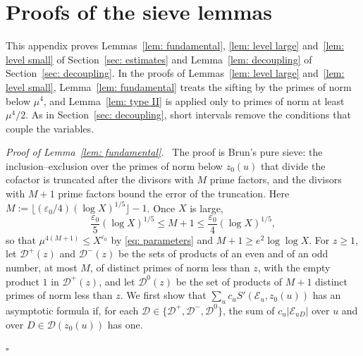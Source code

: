 \documentclass{article}
\numberwithin{equation}{section}
\newenvironment{proof}[1][Proof]{\par\medskip\noindent\textit{#1.}\ }{\hfill$\square$\par\medskip}
\newcommand{\Le}{\leqslant}
\newcommand{\Ge}{\geqslant}
\begin{document}
\section{Proofs of the sieve lemmas}
\label{app: sieve}

This appendix proves Lemmas~\ref{lem: fundamental}, \ref{lem: level large} and~\ref{lem: level small} of Section~\ref{sec: estimates} and Lemma~\ref{lem: decoupling} of Section~\ref{sec: decoupling}. In the proofs of Lemmas~\ref{lem: level large} and~\ref{lem: level small}, Lemma~\ref{lem: fundamental} treats the sifting by the primes of norm below $\mu^4$, and Lemma~\ref{lem: type II} is applied only to primes of norm at least $\mu^4/2$. As in Section~\ref{sec: decoupling}, short intervals remove the conditions that couple the variables.

\begin{proof}[Proof of Lemma~\ref{lem: fundamental}]
The proof is Brun's pure sieve: the inclusion--exclusion over the primes of norm below $z_0(u)$ that divide the cofactor is truncated after the divisors with $M$ prime factors, and the divisors with $M + 1$ prime factors bound the error of the truncation. Here $M := \lfloor (\varepsilon_0/4) (\log X)^{1/5} \rfloor - 1$. Once $X$ is large,
\begin{equation*}
\frac{\varepsilon_0}{5} (\log X)^{1/5} \Le M + 1 \Le \frac{\varepsilon_0}{4} (\log X)^{1/5},
\end{equation*}
so that $\mu^{4(M+1)} \Le X^{\varepsilon_0}$ by \eqref{eq: parameters} and $M + 1 \Ge e^2 \log\log X$. For $z \Ge 1$, let $\mathcal{D}^{+}(z)$ and $\mathcal{D}^{-}(z)$ be the sets of products of an even and of an odd number, at most $M$, of distinct primes of norm less than $z$, with the empty product $1$ in $\mathcal{D}^{+}(z)$, and let $\mathcal{D}^{0}(z)$ be the set of products of $M + 1$ distinct primes of norm less than $z$. We first show that $\sum_u c_u S'(\mathcal{E}_u, z_0(u))$ has an asymptotic formula if, for each $\mathcal{D} \in \{\mathcal{D}^+, \mathcal{D}^-, \mathcal{D}^0\}$, the sum of $c_u |\mathcal{E}_{uD}|$ over $u$ and over $D \in \mathcal{D}(z_0(u))$ has one.


\end{proof}
\end{document}
